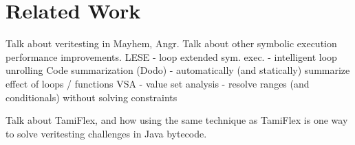 \section{Related Work}
Talk about veritesting in Mayhem, Angr.
Talk about other symbolic execution performance improvements.
LESE - loop extended sym. exec. 
  - intelligent loop unrolling
Code summarization (Dodo)
  - automatically (and statically) summarize effect of loops / functions
VSA - value set analysis
  - resolve ranges (and conditionals) without solving constraints

Talk about TamiFlex, and how using the same technique as TamiFlex is one way to solve veritesting challenges in Java bytecode.